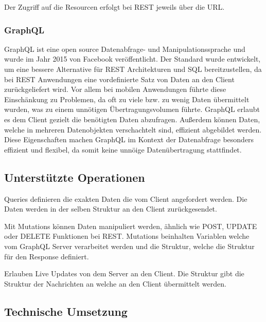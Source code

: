 Der Zugriff auf die Resourcen erfolgt bei REST jeweils über die URL.

\clearpage
\subsubsection{GraphQL}
GraphQL ist eine open source Datenabfrage- und Manipulationssprache und wurde im Jahr 2015 von Facebook veröffentlicht.
Der Standard wurde entwickelt, um eine bessere Alternative für REST Architekturen und SQL bereitzustellen, da bei REST Anwendungen eine vordefinierte Satz von Daten an den Client  zurückgeliefert wird. Vor allem bei mobilen Anwendungen führte diese Einschänkung zu Problemen, da oft zu viele bzw. zu wenig Daten übermittelt wurden, was zu einem unnötigen Übertragungsvolumen führte.
GraphQL erlaubt es dem Client gezielt die benötigten Daten abzufragen. Außerdem können Daten, welche in mehreren Datenobjekten verschachtelt sind, effizient abgebildet werden. Diese Eigenschaften machen GraphQL im Kontext der Datenabfrage besonders effizient und flexibel, da somit keine unnöige Datenübertragung stattfindet. 


\subsection*{Unterstützte Operationen}

\begin{description}[leftmargin=2cm, style=nextline]
	\item[Queries (schreibend):]  
	Queries definieren die exakten Daten die vom Client angefordert werden. Die Daten werden in der selben Struktur an den Client zurückgesendet.
	
	\item[Mutations (manipulierend): ]  
	Mit Mutations können Daten manipuliert werden, ähnlich wie POST, UPDATE oder DELETE Funktionen bei REST. Mutations beinhalten Variablen welche vom GraphQL Server verarbeitet werden und die Struktur, welche die Struktur für den Response definiert.
	
	\item[Subscriptions:]  
	Erlauben Live Updates von dem Server an den Client. Die Struktur gibt die Struktur der Nachrichten an welche an den Client übermittelt werden. 
\end{description}

\subsection*{Technische Umsetzung}

